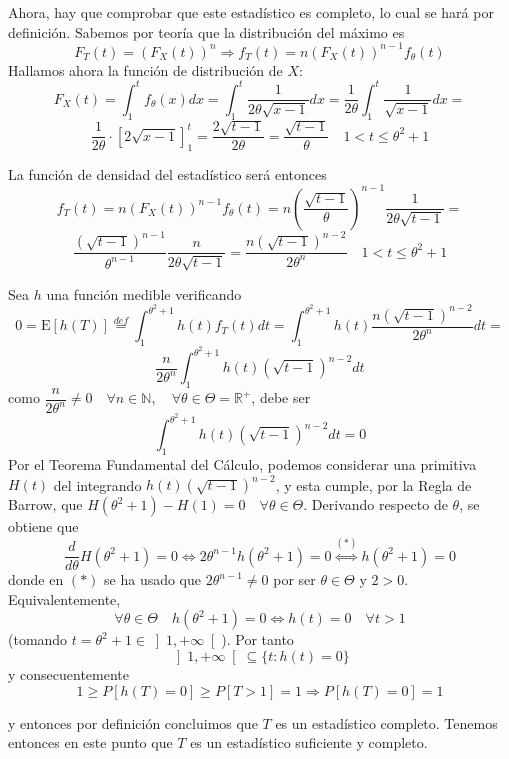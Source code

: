 \documentclass[12pt]{article}
\newcommand{\E}{\mathrm{E}}
\newcommand{\R}{\mathbb{R}}
\newcommand{\Rmas}{\R^{+}}
\newcommand{\N}{\mathbb{N}}
\begin{document}
\begin{ejercicio}
\begin{enumerate}[label=\alph*)]
            \newpage

            Ahora, hay que comprobar que este estadístico es completo, 
            lo cual se hará por definición. Sabemos por teoría que la distribución del máximo es 
            $$F_T(t) = (F_X(t))^n \Longrightarrow f_T(t) = n(F_X(t))^{n-1} f_\theta(t)$$
            Hallamos ahora la función de distribución de $X$:
            $$F_X(t) = \int_{1}^{t} f_\theta(x) dx = \int_{1}^{t} \frac{1}{2\theta\sqrt{x-1}} dx = \dfrac{1}{2 \theta} \int_{1}^{t} \frac{1}{\sqrt{x-1}} dx = $$
            $$\dfrac{1}{2 \theta} \cdot \left[2 \sqrt{x-1} \right]_{1}^{t} = \dfrac{2 \sqrt{t-1}}{2\theta} = \dfrac{\sqrt{t-1}}{\theta} \quad 1 < t \leq \theta^2+1$$

            La función de densidad del estadístico será entonces
            $$f_T(t) = n(F_X(t))^{n-1} f_\theta(t) = n \left(\dfrac{\sqrt{t-1}}{\theta}\right)^{n-1} \frac{1}{2\theta\sqrt{t-1}} = $$
            $$\dfrac{(\sqrt{t-1})^{n-1}}{\theta^{n-1}} \frac{n}{2\theta\sqrt{t-1}} = \dfrac{n(\sqrt{t-1})^{n-2}}{2\theta^{n}} \quad 1 < t \leq \theta^2+1$$

            Sea $h$ una función medible verificando $$0 = \E[h(T)] \stackrel{def}{=} \int_{1}^{\theta^2+1} h(t) f_T(t) dt = 
            \int_{1}^{\theta^2+1} h(t) \dfrac{n(\sqrt{t-1})^{n-2}}{2\theta^{n}} dt =$$
            $$\dfrac{n}{2\theta^{n}} \int_{1}^{\theta^2+1} h(t) (\sqrt{t-1})^{n-2} dt$$
            como $\dfrac{n}{2\theta^{n}} \neq 0 \quad \forall n \in \N, \quad \forall \theta \in \Theta = \Rmas$, debe ser
            $$\int_{1}^{\theta^2+1} h(t) (\sqrt{t-1})^{n-2} dt = 0$$
            Por el Teorema Fundamental del Cálculo, podemos considerar una primitiva $H(t)$ del integrando $h(t) (\sqrt{t-1})^{n-2}$, y esta cumple,
            por la Regla de Barrow, que $H(\theta^2+1) - H(1) = 0 \quad \forall \theta \in \Theta$. Derivando respecto de $\theta$, se obtiene que
            $$\dfrac{d}{d \theta}H(\theta^2+1) = 0 \iff 2 \theta^{n-1} h(\theta^2+1) = 0 \stackrel{(*)}{\iff} h(\theta^2+1) = 0$$
            donde en $(*)$ se ha usado que $2 \theta^{n-1} \neq 0$ por ser $\theta \in \Theta$ y $2 > 0$. Equivalentemente, 
            $$\forall \theta \in \Theta \quad h(\theta^2+1) = 0 \iff h(t) = 0 \quad \forall t > 1$$ (tomando $t = \theta^2+1 \in \left]1, +\infty \right[$).
            Por tanto $$\left]1, +\infty \right[ \subseteq \{t : h(t) = 0\}$$ y consecuentemente $$1 \geqslant P[h(T) = 0] \geqslant P[T > 1] = 1
            \Longrightarrow P[h(T) = 0] = 1$$

            y entonces por definición concluimos que $T$ es un estadístico completo. Tenemos entonces en este punto
            que $T$ es un estadístico suficiente y completo. \\


\end{enumerate}
\end{ejercicio}
\end{document}
